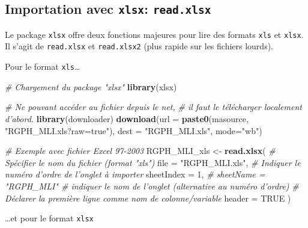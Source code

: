 \documentclass[]{book}
\newenvironment{Shaded}{\begin{snugshade}}{\end{snugshade}}
\newcommand{\KeywordTok}[1]{\textcolor[rgb]{0.13,0.29,0.53}{\textbf{#1}}}
\newcommand{\DataTypeTok}[1]{\textcolor[rgb]{0.13,0.29,0.53}{#1}}
\newcommand{\DecValTok}[1]{\textcolor[rgb]{0.00,0.00,0.81}{#1}}
\newcommand{\StringTok}[1]{\textcolor[rgb]{0.31,0.60,0.02}{#1}}
\newcommand{\CommentTok}[1]{\textcolor[rgb]{0.56,0.35,0.01}{\textit{#1}}}
\newcommand{\OtherTok}[1]{\textcolor[rgb]{0.56,0.35,0.01}{#1}}
\newcommand{\NormalTok}[1]{#1}
\begin{document}
\subsection{\texorpdfstring{Importation avec \texttt{xlsx}:
\texttt{read.xlsx}}{Importation avec xlsx: read.xlsx}}\label{importation-avec-xlsx-read.xlsx}

Le package \texttt{xlsx} offre deux fonctions majeures pour lire des
formats \texttt{xls} et \texttt{xlsx}. Il s'agit de \texttt{read.xlsx}
et \texttt{read.xlsx2} (plus rapide sur les fichiers lourds).

Pour le format \texttt{xls}\ldots{}

\begin{Shaded}
\begin{Highlighting}[]
\CommentTok{# Chargement du package "xlsx"}
\KeywordTok{library}\NormalTok{(xlsx)}

\CommentTok{# Ne pouvant accéder au fichier depuis le net,}
\CommentTok{# il faut le télécharger localement d'abord.}
\KeywordTok{library}\NormalTok{(downloader)}
\KeywordTok{download}\NormalTok{(}\DataTypeTok{url =} \KeywordTok{paste0}\NormalTok{(masource, }\StringTok{"RGPH_MLI.xls?raw=true"}\NormalTok{), }
         \DataTypeTok{dest =} \StringTok{"RGPH_MLI.xls"}\NormalTok{, }
         \DataTypeTok{mode=}\StringTok{"wb"}\NormalTok{)}

\CommentTok{# Exemple avec fichier Excel 97-2003}
\NormalTok{RGPH_MLI_xls <-}\StringTok{ }\KeywordTok{read.xlsx}\NormalTok{( }
  \CommentTok{# Spécifier le nom du fichier (format "xls")}
  \DataTypeTok{file =} \StringTok{"RGPH_MLI.xls"}\NormalTok{, }
  \CommentTok{# Indiquer le numéro d'ordre de l'onglet à importer}
  \DataTypeTok{sheetIndex =} \DecValTok{1}\NormalTok{, }
  \CommentTok{#  sheetName = "RGPH_MLI" # indiquer le nom de l'onglet (alternative au numéro d'ordre)}
  \CommentTok{# Déclarer la première ligne comme nom de colonne/variable}
  \DataTypeTok{header =} \OtherTok{TRUE}
\NormalTok{)}
\end{Highlighting}
\end{Shaded}

\ldots{}et pour le format \texttt{xlsx}
\end{document}
